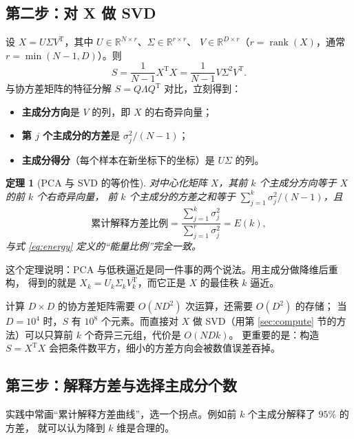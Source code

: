 \documentclass[UTF8, 11pt, a4paper, fontset=windows]{ctexart}
\theoremstyle{cnthm}
\newtheorem{thm}{定理}[section]
\theoremstyle{cndef}
\newcommand{\T}{^{\mathrm{T}}}
\newcommand{\R}{\mathbb{R}}
\DeclareMathOperator{\rank}{rank}
\begin{document}
\subsection{第二步：对 X 做 SVD}

设 $X=U\Sigma V\T$，其中 $U\in\R^{N\times r}$、$\Sigma\in\R^{r\times r}$、
$V\in\R^{D\times r}$（$r=\rank(X)$，通常 $r=\min(N-1,D)$）。则
\begin{equation}
  S=\frac{1}{N-1}X\T X=\frac{1}{N-1}V\Sigma^2V\T .
\end{equation}
与协方差矩阵的特征分解 $S=Q\Lambda Q\T$ 对比，立刻得到：
\begin{itemize}
  \item \textbf{主成分方向}是 $V$ 的列，即 $X$ 的右奇异向量；
  \item \textbf{第 $j$ 个主成分的方差}是 $\sigma_j^2/(N-1)$；
  \item \textbf{主成分得分}（每个样本在新坐标下的坐标）是 $U\Sigma$ 的列。
\end{itemize}

\begin{thm}[PCA 与 SVD 的等价性]\label{thm:pca-svd}
对中心化矩阵 $X$，其前 $k$ 个主成分方向等于 $X$ 的前 $k$ 个右奇异向量，
前 $k$ 个主成分的方差之和等于 $\sum_{j=1}^{k}\sigma_j^2/(N-1)$，且
\begin{equation}
  \text{累计解释方差比例}=\frac{\sum_{j=1}^{k}\sigma_j^2}{\sum_{j=1}^{r}\sigma_j^2}=E(k),
\end{equation}
与式 \eqref{eq:energy} 定义的“能量比例”完全一致。
\end{thm}

这个定理说明：PCA 与低秩逼近是同一件事的两个说法。用主成分做降维后重构，
得到的就是 $X_k=U_k\Sigma_kV_k\T$，而它正是 $X$ 的最佳秩 $k$ 逼近。

\begin{insight}
计算 $D\times D$ 的协方差矩阵需要 $O(ND^2)$ 次运算，还需要 $O(D^2)$ 的存储；
当 $D=10^4$ 时，$S$ 有 $10^8$ 个元素。而直接对 $X$ 做 SVD（用第 \ref{sec:compute}
节的方法）可以只算前 $k$ 个奇异三元组，代价是 $O(NDk)$。
更重要的是：构造 $S=X\T X$ 会把条件数平方，细小的方差方向会被数值误差吞掉。
\end{insight}

\subsection{第三步：解释方差与选择主成分个数}

实践中常画“累计解释方差曲线”，选一个拐点。例如前 $k$ 个主成分解释了 $95\%$ 的方差，
就可以认为降到 $k$ 维是合理的。
\end{document}
